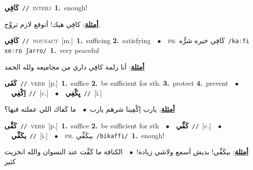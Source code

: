 \documentclass[10pt,a4paper,twoside]{article} %
\begin{document}
\begin{multicols}{2}
{\setlength\topsep{0pt}\textbf{\foreignlanguage{arabic}{كَافِي}}\ {\color{gray}\texttt{//}\color{black}}\ \textsc{interj}\ \textbf{1.}~enough!\  \begin{flushright}\color{gray}\foreignlanguage{arabic}{\textbf{\underline{\foreignlanguage{arabic}{أمثلة}}}: كافِي هيك! أتوقع لازم تروِّح.}\end{flushright}\color{black}} \vspace{2mm}

{\setlength\topsep{0pt}\textbf{\foreignlanguage{arabic}{كَافِي}}\ {\color{gray}\texttt{//}\color{black}}\ \textsc{noun\textunderscore act}\ [m.]\ \textbf{1.}~sufficing  \textbf{2.}~satisfying\ \ $\bullet$\ \ \textsc{ph.} \color{gray} \foreignlanguage{arabic}{كَافِي خيره شرُّه}\color{black}\ {\color{gray}\texttt{/{\sffamily kaːfi xeːro ʃarro}/}\color{black}}\ \textbf{1.}~very peaceful\  \begin{flushright}\color{gray}\foreignlanguage{arabic}{\textbf{\underline{\foreignlanguage{arabic}{أمثلة}}}: أنا زلمة كافِي داري من مجاميعه ولله الحمد}\end{flushright}\color{black}} \vspace{2mm}

{\setlength\topsep{0pt}\textbf{\foreignlanguage{arabic}{كَفَى}}\ {\color{gray}\texttt{//}\color{black}}\ \textsc{verb}\ [p.]\ \textbf{1.}~suffice  \textbf{2.}~be sufficient for sth.  \textbf{3.}~protect  \textbf{4.}~prevent\ \ $\bullet$\ \ \setlength\topsep{0pt}\textbf{\foreignlanguage{arabic}{اِكْفِي}}\ {\color{gray}\texttt{//}\color{black}}\ [c.]\ \ $\bullet$\ \ \setlength\topsep{0pt}\textbf{\foreignlanguage{arabic}{يِكْفِي}}\ {\color{gray}\texttt{//}\color{black}}\ [i.]\  \begin{flushright}\color{gray}\foreignlanguage{arabic}{\textbf{\underline{\foreignlanguage{arabic}{أمثلة}}}: يارب اِكْفِينا شرهم يارب\ $\bullet$\ \  ما كَفاك اللي عملته فيها؟}\end{flushright}\color{black}} \vspace{2mm}

{\setlength\topsep{0pt}\textbf{\foreignlanguage{arabic}{كَفَّى}}\ {\color{gray}\texttt{//}\color{black}}\ \textsc{verb}\ [p.]\ \textbf{1.}~suffice  \textbf{2.}~be sufficient for sth\ \ $\bullet$\ \ \setlength\topsep{0pt}\textbf{\foreignlanguage{arabic}{كَفِّي}}\ {\color{gray}\texttt{//}\color{black}}\ [c.]\ \ $\bullet$\ \ \setlength\topsep{0pt}\textbf{\foreignlanguage{arabic}{يكَفِّي}}\ {\color{gray}\texttt{//}\color{black}}\ [i.]\ \ $\bullet$\ \ \textsc{ph.} \color{gray} \foreignlanguage{arabic}{بيكَفِّي}\color{black}\ {\color{gray}\texttt{/{\sffamily bikaffi}/}\color{black}}\ \textbf{1.}~enough!\  \begin{flushright}\color{gray}\foreignlanguage{arabic}{\textbf{\underline{\foreignlanguage{arabic}{أمثلة}}}: بيكَفِّي! بديش أسمع ولاشي زيادة!\ $\bullet$\ \  الكنافة ما كَفَّت عند النسوان والله انخزيت كثير}\end{flushright}\color{black}} \vspace{2mm}


\end{multicols}
\end{document}
